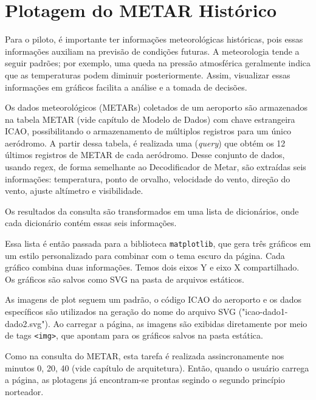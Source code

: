\chapter{Plotagem do METAR Histórico}

Para o piloto, é importante ter informações meteorológicas históricas, pois 
essas informações auxiliam na previsão de condições futuras. A meteorologia tende 
a seguir padrões; por exemplo, uma queda na pressão atmosférica geralmente indica 
que as temperaturas podem diminuir posteriormente. Assim, visualizar essas 
informações em gráficos facilita a análise e a tomada de decisões.

Os dados meteorológicos (METARs) coletados de um aeroporto são armazenados na tabela
METAR (vide capítulo de Modelo de Dados) com chave estrangeira ICAO, possibilitando
o armazenamento de múltiplos registros para um único aeródromo. A partir dessa 
tabela, é realizada uma (\textit{query}) que obtém os 12 últimos registros 
de METAR de cada aeródromo. Desse conjunto de dados, usando regex, de forma
semelhante ao Decodificador de Metar, são extraídas seis informações: 
temperatura, ponto de orvalho, velocidade do vento, direção do vento, ajuste altímetro e visibilidade.

Os resultados da consulta são transformados em uma lista de dicionários, onde 
cada dicionário contém essas seis informações.




Essa lista é então passada para a biblioteca \texttt{matplotlib}, que gera três 
gráficos em um estilo personalizado para combinar com o tema escuro da página. 
Cada gráfico combina duas informações. Temos dois eixos Y e eixo X compartilhado.
Os gráficos são salvos como SVG na pasta de arquivos estáticos.

As imagens de plot seguem um padrão, o código ICAO do aeroporto e os dados 
específicos são utilizados na geração do nome do arquivo SVG ("icao-dado1-dado2.svg"). 
Ao carregar a página, as imagens são exibidas diretamente por meio de tags \texttt{<img>},
 que apontam para os gráficos salvos na pasta estática.

Como na consulta do METAR, esta tarefa é realizada assincronamente nos 
minutos 0, 20, 40 (vide capítulo de arquitetura). Então, quando o usuário carrega a 
página, as plotagens já encontram-se prontas segindo o segundo princípio norteador.
